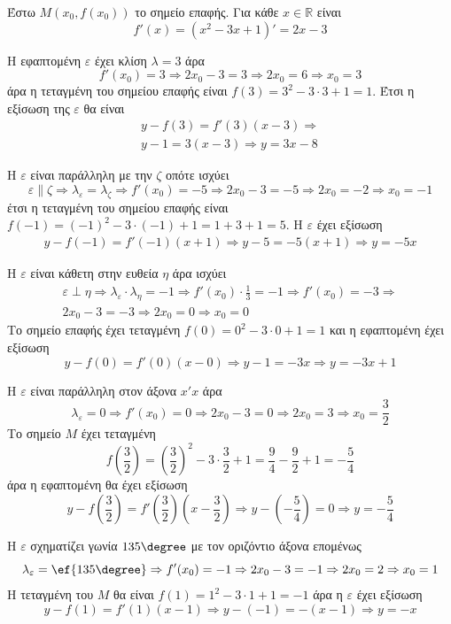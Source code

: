 \lysh
Έστω $M(x_0,f(x_0))$ το σημείο επαφής. Για κάθε $x\in\mathbb{R}$ είναι
\[f'(x)=\left(x^2-3x+1\right)'=2x-3\]
\begin{alist}
\item Η εφαπτομένη $\varepsilon$ έχει κλίση $\lambda=3$ άρα
\[f'(x_0)=3\Rightarrow2x_0-3=3\Rightarrow2x_0=6\Rightarrow x_0=3\]
άρα η τεταγμένη του σημείου επαφής είναι $f(3)=3^2-3\cdot3+1=1$. Έτσι η εξίσωση της $\varepsilon$ θα είναι
\begin{gather*}
y-f(3)=f'(3)(x-3)\Rightarrow\\
y-1=3(x-3)\Rightarrow y=3x-8
\end{gather*}
\item Η $\varepsilon$ είναι παράλληλη με την $\zeta$ οπότε ισχύει
\[\varepsilon\parallel\zeta\Rightarrow\lambda_{\varepsilon}=\lambda_{\zeta}\Rightarrow f'(x_0)=-5\Rightarrow 2x_0-3=-5\Rightarrow 2x_0=-2\Rightarrow x_0=-1\]
έτσι η τεταγμένη του σημείου επαφής είναι $f(-1)=(-1)^2-3\cdot(-1)+1=1+3+1=5$. Η $\varepsilon$ έχει εξίσωση 
\begin{gather*}
y-f(-1)=f'(-1)(x+1)\Rightarrow
y-5=-5(x+1)\Rightarrow y=-5x
\end{gather*}
\item Η $\varepsilon$ είναι κάθετη στην ευθεία $\eta$ άρα ισχύει
\begin{gather*}
\varepsilon\perp\eta\Rightarrow \lambda_{\varepsilon}\cdot\lambda_{\eta}=-1\Rightarrow f'(x_0)\cdot\frac{1}{3}=-1\Rightarrow f'(x_0)=-3\Rightarrow\\
2x_0-3=-3\Rightarrow 2x_0=0\Rightarrow x_0=0
\end{gather*}
Το σημείο επαφής έχει τεταγμένη $f(0)=0^2-3\cdot 0+1=1$ και η εφαπτομένη έχει εξίσωση
\[y-f(0)=f'(0)(x-0)\Rightarrow y-1=-3x\Rightarrow y=-3x+1\]
\item Η $\varepsilon$ είναι παράλληλη στον άξονα $x'x$ άρα
\[\lambda_{\varepsilon}=0\Rightarrow f'(x_0)=0\Rightarrow 2x_0-3=0\Rightarrow 2x_0=3\Rightarrow x_0=\frac{3}{2}\]
Το σημείο $M$ έχει τεταγμένη
\[ f\left(\frac{3}{2}\right)=\left(\frac{3}{2}\right)^2-3\cdot\frac{3}{2}+1=\frac{9}{4}-\frac{9}{2}+1=-\frac{5}{4} \]
άρα η εφαπτομένη θα έχει εξίσωση
\[ y-f\left(\frac{3}{2}\right)=f'\left(\frac{3}{2}\right)\left(x-\frac{3}{2}\right)\Rightarrow y-\left(-\frac{5}{4}\right)=0\Rightarrow y=-\frac{5}{4} \]
\item Η $\varepsilon$ σχηματίζει γωνία $135\degree$ με τον οριζόντιο άξονα επομένως
\[ \lambda_{\varepsilon}=\ef{135\degree}\Rightarrow f'(x_0)=-1\Rightarrow 2x_0-3=-1\Rightarrow 2x_0=2\Rightarrow x_0=1 \]
Η τεταγμένη του $M$ θα είναι $f(1)=1^2-3\cdot 1+1=-1$ άρα η $\varepsilon$ έχει εξίσωση
\[ y-f(1)=f'(1)(x-1)\Rightarrow y-(-1)=-(x-1)\Rightarrow y=-x \]
\end{alist}
